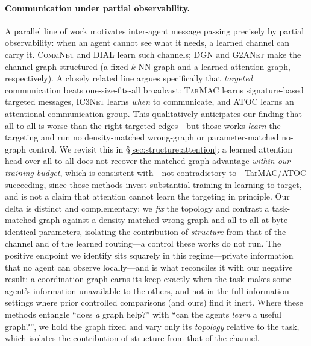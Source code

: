 \documentclass[manuscript, screen, review]{jair}
\providecommand{\citep}{\parencite}
\newcommand{\algoname}[1]{\textsc{#1}}
\begin{document}
\paragraph{Communication under partial observability.} A parallel line of
work motivates inter-agent message passing precisely by partial
observability: when an agent cannot see what it needs, a learned channel can
carry it. \algoname{CommNet} \citep{sukhbaatar_2016_commnet} and
\algoname{DIAL} \citep{foerster_2016_rial_dial} learn such channels;
\algoname{DGN} \citep{jiang_2020_dgn} and \algoname{G2ANet}
\citep{liu_2020_g2anet} make the channel graph-structured (a fixed $k$-NN
graph and a learned attention graph, respectively). A closely related line
argues specifically that \emph{targeted} communication beats one-size-fits-all
broadcast: \algoname{TarMAC} \citep{das_2019_tarmac} learns signature-based
targeted messages, \algoname{IC3Net} \citep{singh_2019_ic3net} learns
\emph{when} to communicate, and \algoname{ATOC} \citep{jiang_2018_atoc} learns
an attentional communication group. This qualitatively anticipates our
finding that all-to-all is worse than the right targeted edges---but those
works \emph{learn} the targeting and run no density-matched wrong-graph or
parameter-matched no-graph control. We revisit this in
\S\ref{sec:structure:attention}: a learned attention head over all-to-all does
not recover the matched-graph advantage \emph{within our training budget},
which is consistent with---not contradictory to---TarMAC/ATOC succeeding, since
those methods invest substantial training in learning to target, and is not a
claim that attention cannot learn the targeting in principle. Our delta is distinct and complementary:
we \emph{fix} the topology and contrast a task-matched graph against a
density-matched wrong graph and all-to-all at byte-identical parameters,
isolating the contribution of \emph{structure} from that of the channel and of
the learned routing---a control these works do not run.
The positive endpoint we
identify sits squarely in this regime---private information that no agent can
observe locally---and is what reconciles it with our negative result: a
coordination graph earns its keep exactly when the task makes some agent's
information unavailable to the others, and not in the full-information
settings where prior controlled comparisons (and ours) find it inert. Where
these methods entangle ``does \emph{a} graph help?'' with ``can the agents
\emph{learn} a useful graph?'', we hold the graph fixed and vary only its
\emph{topology} relative to the task, which isolates the contribution of
structure from that of the channel.
\end{document}
